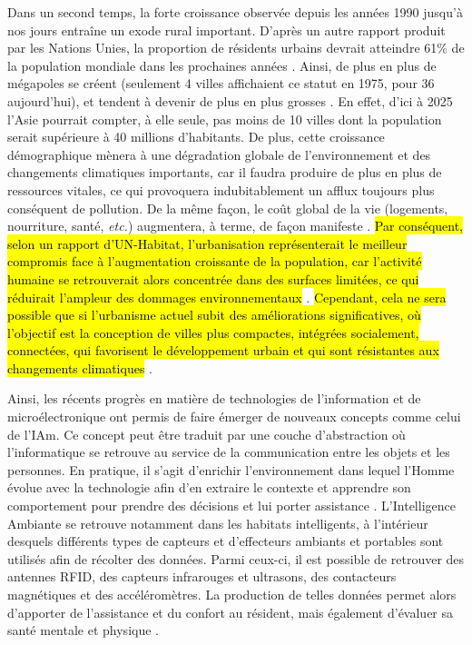 Dans un second temps, la forte croissance observée depuis les années 1990 jusqu'à nos jours entraîne un exode rural important. D'après un autre rapport produit par les Nations Unies, la proportion de résidents urbains devrait atteindre 61\% de la population mondiale dans les prochaines années \citep{UnitedNations2017a}. Ainsi, de plus en plus de mégapoles se créent (seulement 4 villes affichaient ce statut en 1975, pour 36 aujourd'hui), et tendent à devenir de plus en plus grosses \citep{UnitedNations2017a}. En effet, d'ici à 2025 l'Asie pourrait compter, à elle seule, pas moins de 10 villes dont la population serait supérieure à 40 millions d'habitants. De plus, cette croissance démographique mènera à une dégradation globale de l'environnement et des changements climatiques importants, car il faudra produire de plus en plus de ressources vitales, ce qui provoquera indubitablement un afflux toujours plus conséquent de pollution. De la même façon, le coût global de la vie (logements, nourriture, santé, \textit{etc.}) augmentera, à terme, de façon manifeste \citep{UnitedNations2017a}. \hl{Par conséquent, selon un rapport d'UN-Habitat, l'urbanisation représenterait le meilleur compromis face à l'augmentation croissante de la population, car l'activité humaine se retrouverait alors concentrée dans des surfaces limitées, ce qui réduirait l'ampleur des dommages environnementaux} \citep{UNFPA2007}. \hl{Cependant, cela ne sera possible que si l'urbanisme actuel subit des améliorations significatives, où l'objectif est la conception de villes plus compactes, intégrées socialement, connectées, qui favorisent le développement urbain et qui sont résistantes aux changements climatiques} \citep{UNFPA2007}.

Ainsi, les récents progrès en matière de technologies de l'information et de microélectronique ont permis de faire émerger de nouveaux concepts comme celui de l'\ac{IAm}. Ce concept peut être traduit par une couche d'abstraction où l'informatique se retrouve au service de la communication entre les objets et les personnes. En pratique, il s'agit d'enrichir l'environnement dans lequel l'Homme évolue avec la technologie afin d'en extraire le contexte et apprendre son comportement pour prendre des décisions et lui porter assistance \citep{Sadri2011}. L'Intelligence Ambiante se retrouve notamment dans les habitats intelligents, à l'intérieur desquels différents types de capteurs et d'effecteurs ambiants et portables sont utilisés afin de récolter des données. Parmi ceux-ci, il est possible de retrouver des antennes RFID, des capteurs infrarouges et ultrasons, des contacteurs magnétiques et des accéléromètres. La production de telles données permet alors d'apporter de l'assistance et du confort au résident, mais également d'évaluer sa santé mentale et physique \citep{Rashidi2013, Haux2016, Harris2016, Johnson2018}.

